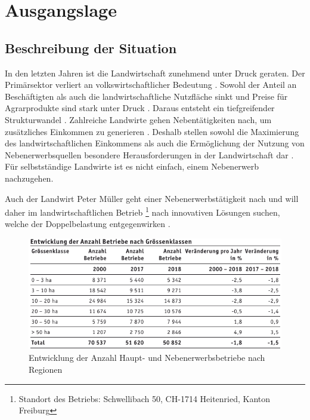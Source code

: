 

\chapter{Ausgangslage}

\section{Beschreibung der Situation }

In den letzten Jahren ist die Landwirtschaft zunehmend unter Druck geraten. Der Primärsektor verliert an volkswirtschaftlicher Bedeutung \cite[S. 1  f.]{Hofer}. Sowohl der Anteil an Beschäftigten als auch die landwirtschaftliche Nutzfläche sinkt \citep[S. 2 ]{Hofer} und Preise für Agrarprodukte sind stark unter Druck \citep[S. 11 ]{Hofer}. Daraus entsteht ein tiefgreifender Strukturwandel \cite[S. 11  f.]{Hofer}. Zahlreiche Landwirte gehen Nebentätigkeiten nach, um zusätzliches Einkommen zu generieren \citep[S. 6]{Hofer}. Deshalb stellen sowohl die Maximierung des landwirtschaftlichen Einkommens als auch die Ermöglichung der Nutzung von Nebenerwerbsquellen besondere Herausforderungen in der Landwirtschaft dar \citep[S. 8]{Stefan2003}. Für selbstständige Landwirte ist es nicht einfach, einem Nebenerwerb nachzugehen.


Auch der Landwirt Peter Müller geht einer Nebenerwerbstätigkeit nach und will daher im landwirtschaftlichen Betrieb \footnote{Standort des Betriebs: Schwellibach 50, CH-1714 Heitenried, Kanton Freiburg} nach innovativen Lösungen suchen, welche der Doppelbelastung entgegenwirken \citep{Muller2019}. \\


\begin{figure}[H]
	\center
	\includegraphics[scale=0.72]{Grafiken/Betriebsstatistik.PNG}
	\caption{Entwicklung der Anzahl Haupt- und Nebenerwerbsbetriebe nach Regionen \citep{Unbekannta}} 
	\label{fig: Entwicklung der Anzahl Haupt- und Nebenerwerbsbetriebe nach Regionen}
\end{figure}


